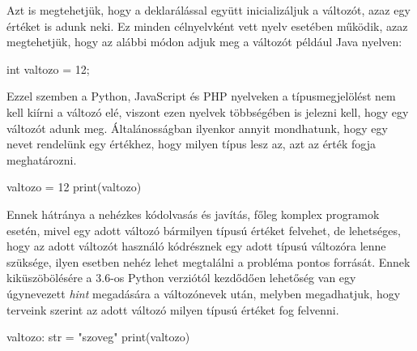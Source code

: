 Azt is megtehetjük, hogy a deklarálással együtt inicializáljuk a változót, azaz egy értéket is adunk neki. Ez minden célnyelvként vett nyelv esetében működik, azaz megtehetjük, hogy az alábbi módon adjuk meg a változót például Java nyelven:
\begin{cpp}
	int valtozo = 12;
\end{cpp}

Ezzel szemben a Python, JavaScript és PHP nyelveken a típusmegjelölést nem kell kiírni a változó elé, viszont ezen nyelvek többségében is jelezni kell, hogy egy változót adunk meg. Általánosságban ilyenkor annyit mondhatunk, hogy egy nevet rendelünk egy értékhez, hogy milyen típus lesz az, azt az érték fogja meghatározni.
\begin{cpp}
	valtozo = 12
	print(valtozo)
\end{cpp}
Ennek hátránya a nehézkes kódolvasás és javítás, főleg komplex programok esetén, mivel egy adott változó bármilyen típusú értéket felvehet, de lehetséges, hogy az adott változót használó kódrésznek egy adott típusú változóra lenne szüksége, ilyen esetben nehéz lehet megtalálni a probléma pontos forrását. Ennek kiküszöbölésére a 3.6-os Python verziótól kezdődően lehetőség van egy úgynevezett \textit{hint} megadására a változónevek után, melyben megadhatjuk, hogy terveink szerint az adott változó milyen típusú értéket fog felvenni.

\begin{cpp}
	valtozo: str = "szoveg"
	print(valtozo)
\end{cpp}


